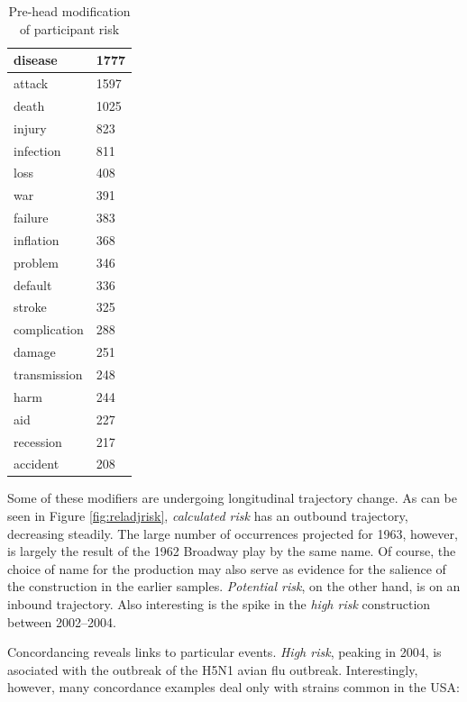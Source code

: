 \begin{table}
{\begin{minipage}{0.35\textwidth}
\begin{tabular}{|l|l|}
					disease            & 1777  \\ \hline
					attack             & 1597  \\ \hline
					death              & 1025  \\ \hline
					injury             & 823   \\ \hline
					infection          & 811   \\ \hline
					loss               & 408   \\ \hline
					war                & 391   \\ \hline
					failure            & 383   \\ \hline
					inflation          & 368   \\ \hline
					problem            & 346   \\ \hline
					default            & 336   \\ \hline
					stroke             & 325   \\ \hline
					complication       & 288   \\ \hline
					damage             & 251   \\ \hline
					transmission       & 248   \\ \hline
					harm               & 244   \\ \hline
					aid                & 227   \\ \hline
					recession          & 217   \\ \hline
					accident           & 208   \\ \hline
					\end{tabular}
					\caption{Pre-head modification of participant risk}
					\label{tab:posthead}
					\end{minipage}}
					\end{table}

				Some of these modifiers are undergoing longitudinal trajectory change. As can be seen in Figure \ref{fig:reladjrisk}, \emph{calculated risk} has an outbound trajectory, decreasing steadily. The large number of occurrences projected for 1963, however, is largely the result of the 1962 Broadway play by the same name. Of course, the choice of name for the production may also serve as evidence for the salience of the construction in the earlier samples.  \emph{Potential risk}, on the other hand, is on an inbound trajectory. Also interesting is the spike in the \emph{high risk} construction between 2002--2004. %

                Concordancing reveals links to particular events. \emph{High risk}, peaking in 2004, is asociated with the outbreak of the H5N1 avian flu outbreak. Interestingly, however, many concordance examples deal only with strains common in the USA:


